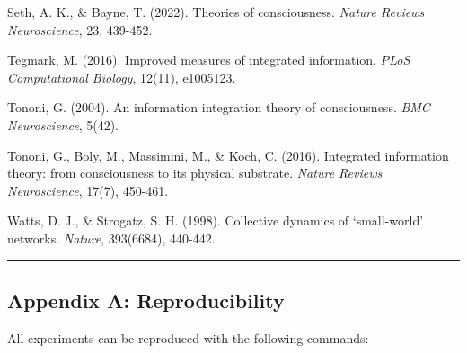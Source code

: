\documentclass[
  11pt,
]{article}
\begin{document}
Seth, A. K., \& Bayne, T. (2022). Theories of consciousness.
\emph{Nature Reviews Neuroscience}, 23, 439-452.

Tegmark, M. (2016). Improved measures of integrated information.
\emph{PLoS Computational Biology}, 12(11), e1005123.

Tononi, G. (2004). An information integration theory of consciousness.
\emph{BMC Neuroscience}, 5(42).

Tononi, G., Boly, M., Massimini, M., \& Koch, C. (2016). Integrated
information theory: from consciousness to its physical substrate.
\emph{Nature Reviews Neuroscience}, 17(7), 450-461.

Watts, D. J., \& Strogatz, S. H. (1998). Collective dynamics of
`small-world' networks. \emph{Nature}, 393(6684), 440-442.

\begin{center}\rule{0.5\linewidth}{0.5pt}\end{center}

\subsection{Appendix A:
Reproducibility}\label{appendix-a-reproducibility}

All experiments can be reproduced with the following commands:
\end{document}
